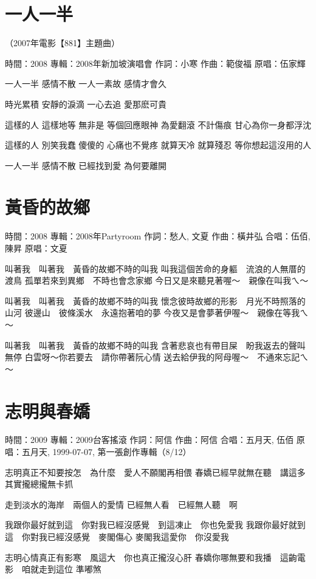 \documentclass[UTF8,a4paper,oneside,twocolumn,12pt]{ctexbook}
\newcommand{\infopair}[2]{\textbullet #1：#2}
\newcommand{\zc}[1][伍佰]{\infopair{作詞}{#1}}
\newcommand{\zq}[1][伍佰]{\infopair{作曲}{#1}}
\newcommand{\zj}[1]{\infopair{專輯}{#1}}
\newcommand{\yc}[1]{\infopair{原唱}{#1}}
\newcommand{\sj}[1]{\infopair{時間}{#1}}
\newenvironment{info}{\begin{flushleft}\kaishu
	}
	{\end{flushleft}\normalsize\yahei\par}
\newenvironment{lyric}{
	}
{}
\begin{document}
\section{一人一半}
\begin{info}
	（2007年電影【881】主題曲）

	\sj{2008}
	\zj{2008年新加坡演唱會}
	\zc[小寒]
	\zq[範俊福]
	\yc{伍家輝}
\end{info}
\begin{lyric}
	一人一半 感情不散
	一人一素故 感情才會久

	時光累積 安靜的淚滴
	一心去追 愛那麽可貴

	這樣的人 這樣地等
	無非是 等個回應眼神
	為愛翻滾 不計傷痕
	甘心為你一身都浮沈

	這樣的人 別笑我蠢
	傻傻的 心痛也不覺疼
	就算天冷 就算殘忍
	等你想起這沒用的人

	一人一半 感情不散
	已經找到愛 為何要離開
\end{lyric}

\section{黃昏的故鄉}
\begin{info}
	\sj{2008}
	\zj{2008年Partyroom}
	\zc[愁人, 文夏]
	\zq[橫井弘]
	\infopair{合唱}{伍佰, 陳昇}
	\yc{文夏}
\end{info}
\begin{lyric}
	叫著我　叫著我　黃昏的故鄉不時的叫我
	叫我這個苦命的身軀　流浪的人無厝的渡鳥
	孤單若來到異鄉　不時也會念家鄉
	今日又是來聽見著喔～　親像在叫我ㄟ～

	叫著我　叫著我　黃昏的故鄉不時的叫我
	懷念彼時故鄉的形影　月光不時照落的山河
	彼邊山　彼條溪水　永遠抱著咱的夢
	今夜又是會夢著伊喔～　親像在等我ㄟ～

	叫著我　叫著我　黃昏的故鄉不時的叫我
	含著悲哀也有帶目屎　盼我返去的聲叫無停
	白雲呀～你若要去　請你帶著阮心情
	送去給伊我的阿母喔～　不通來忘記ㄟ～
\end{lyric}

\section{志明與春嬌}
\begin{info}
	\sj{2009}
	\zj{2009台客搖滾}
	\zc[阿信]
	\zq[阿信]
	\infopair{合唱}{五月天, 伍佰}
	\yc{五月天, 1999-07-07, 第一張創作專輯（8/12）}
\end{info}
\begin{lyric}
	志明真正不知要按怎　為什麼　愛人不願閣再相偎
	春嬌已經早就無在聽　講這多　其實攏總攏無卡抓

	走到淡水的海岸　兩個人的愛情
	已經無人看　已經無人聽　啊

	我跟你最好就到這　你對我已經沒感覺　到這凍止　你也免愛我
	我跟你最好就到這　你對我已經沒感覺　麥閣傷心
	麥閣我這愛你　你沒愛我

	志明心情真正有影寒　風這大　你也真正攏沒心肝
	春嬌你哪無要和我播　這齣電影　咱就走到這位  準嘟煞
\end{lyric}
\end{document}
